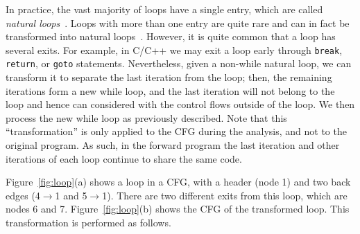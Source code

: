 In practice, the vast majority of loops have a single entry, which are called \emph{natural loops}~\cite{Muchnick}. 
Loops with more than one entry are quite rare and can in fact be transformed into natural loops~\cite{Muchnick}. 
However, it is quite common that a loop has several exits. 
For example, in C/C++ we may exit a loop early through \texttt{break}, \texttt{return}, or \texttt{goto} statements.
Nevertheless, given a non-while natural loop, we can transform it to separate the last iteration from the loop;
then, the remaining iterations form a new while loop, and the last iteration will not belong to the loop and hence can considered with the control flows outside of the loop. 
We then process the new while loop as previously described.
Note that this ``transformation'' is only applied to the CFG during the analysis, and not to the original program.
As such, in the forward program \Forward the last iteration and other iterations of each loop continue to share the same code.


Figure~\ref{fig:loop}(a) shows a loop in a CFG, with a header (node 1) and two back edges (4$\to$1 and 5$\to$1). 
There are two different exits from this loop, which are nodes 6 and 7.
Figure~\ref{fig:loop}(b) shows the CFG of the transformed loop.
This transformation is performed as follows.

